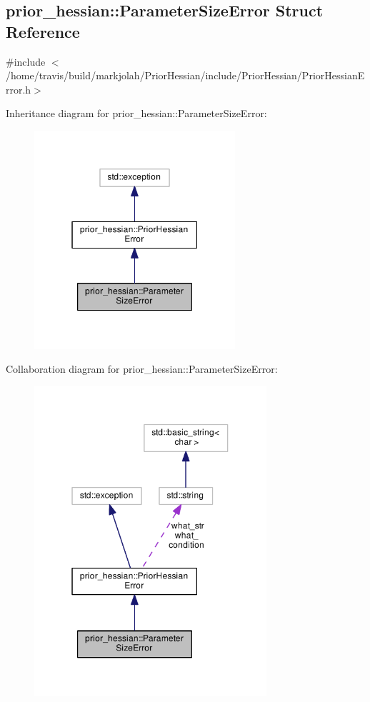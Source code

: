 \hypertarget{structprior__hessian_1_1ParameterSizeError}{}\subsection{prior\+\_\+hessian\+:\+:Parameter\+Size\+Error Struct Reference}
\label{structprior__hessian_1_1ParameterSizeError}


{\ttfamily \#include $<$/home/travis/build/markjolah/\+Prior\+Hessian/include/\+Prior\+Hessian/\+Prior\+Hessian\+Error.\+h$>$}



Inheritance diagram for prior\+\_\+hessian\+:\+:Parameter\+Size\+Error\+:\nopagebreak
\begin{figure}[H]
\begin{center}
\leavevmode
\includegraphics[width=211pt]{structprior__hessian_1_1ParameterSizeError__inherit__graph}
\end{center}
\end{figure}


Collaboration diagram for prior\+\_\+hessian\+:\+:Parameter\+Size\+Error\+:\nopagebreak
\begin{figure}[H]
\begin{center}
\leavevmode
\includegraphics[width=244pt]{structprior__hessian_1_1ParameterSizeError__coll__graph}
\end{center}
\end{figure}
